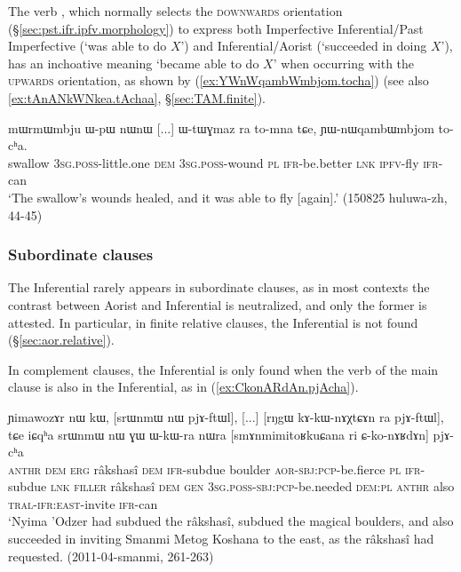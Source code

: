 The verb , which normally selects the \textsc{downwards} orientation (§\ref{sec:pst.ifr.ipfv.morphology}) to express both Imperfective Inferential/Past Imperfective (`was able to do $X$') and Inferential/Aorist (`succeeded in doing $X$'), has an inchoative meaning `became able to do $X$' when occurring with the \textsc{upwards} orientation, as shown by (\ref{ex:YWnWqambWmbjom.tocha}) (see also \ref{ex:tAnANkWNkea.tAchaa}, §\ref{sec:TAM.finite}).

\begin{exe}
\ex \label{ex:YWnWqambWmbjom.tocha}
\gll mɯrmɯmbju ɯ-pɯ nɯnɯ [...] ɯ-tɯɣmaz ra to-mna tɕe, ɲɯ-nɯqambɯmbjom to-cʰa. \\
swallow \textsc{3sg}.\textsc{poss}-little.one \textsc{dem} { } \textsc{3sg}.\textsc{poss}-wound \textsc{pl} \textsc{ifr}-be.better \textsc{lnk} \textsc{ipfv}-fly \textsc{ifr}-can \\
\glt `The swallow's wounds healed, and it was able to fly [again].' (150825 huluwa-zh, 44-45)
\end{exe}

\subsubsection{Subordinate clauses}  \label{sec:pst.ifr.subordinate}
The Inferential rarely appears in subordinate clauses, as in most contexts the contrast between Aorist and Inferential is neutralized, and only the former is attested. In particular, in finite relative clauses, the Inferential is not found (§\ref{sec:aor.relative}). 

In complement clauses, the Inferential is only found when the verb of the main clause is also in the Inferential, as in (\ref{ex:CkonARdAn.pjAcha}). 


\begin{exe}
\ex \label{ex:CkonARdAn.pjAcha}
 \gll  ɲimawozɤr nɯ kɯ, [srɯnmɯ nɯ pjɤ-ftɯl], [...] [rŋgɯ kɤ-kɯ-nɤχtɕɤn ra pjɤ-ftɯl],
tɕe iɕqʰa srɯnmɯ nɯ ɣɯ ɯ-kɯ-ra nɯra [smɤnmimitoʁkuɕana ri ɕ-ko-nɤʁdɤn] pjɤ-cʰa \\
\textsc{anthr} \textsc{dem} \textsc{erg} râkshasî \textsc{dem} \textsc{ifr}-subdue { } boulder \textsc{aor}-\textsc{sbj}:\textsc{pcp}-be.fierce \textsc{pl} \textsc{ifr}-subdue \textsc{lnk} \textsc{filler} râkshasî \textsc{dem} \textsc{gen} \textsc{3sg}.\textsc{poss}-\textsc{sbj}:\textsc{pcp}-be.needed \textsc{dem}:\textsc{pl}  \textsc{anthr} also \textsc{tral}-\textsc{ifr}:\textsc{east}-invite \textsc{ifr}-can \\
\glt `Nyima 'Odzer had subdued the râkshasî, subdued the magical boulders, and also succeeded in inviting Smanmi Metog Koshana to the east, as the râkshasî had requested. (2011-04-smanmi, 261-263)
\end{exe}

